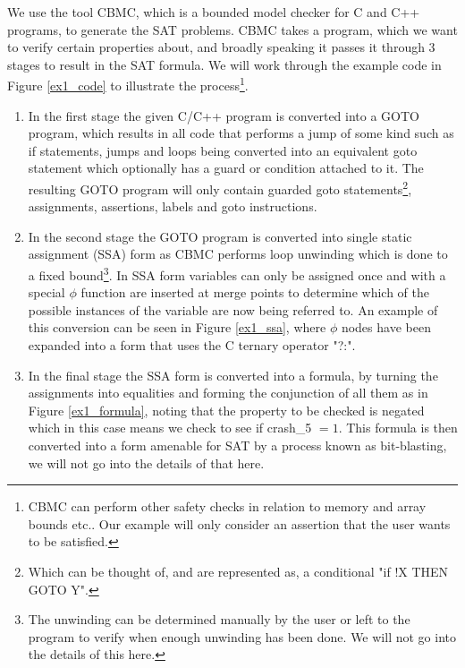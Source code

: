 \documentclass[
10pt, %
a4paper, %
oneside, %
headinclude,footinclude, %
BCOR5mm, %
]{scrartcl}
\begin{document}
We use the tool CBMC, which is a bounded model checker for C and C++ programs, to generate the SAT problems. CBMC takes a program, which we want to verify certain properties about, and broadly speaking it passes it through 3 stages to result in the SAT formula. We will work through the example code in Figure \ref{ex1_code} to illustrate the process\footnote{CBMC can perform other safety checks in relation to memory and array bounds etc.. Our example will only consider an assertion that the user wants to be satisfied.}.
\begin{enumerate}
    \item In the first stage the given C/C++ program is converted into a GOTO program, which results in all code that performs a jump of some kind such as if statements, jumps and loops being converted into an equivalent goto statement which optionally has a guard or condition attached to it. The resulting GOTO program will only contain guarded goto statements\footnote{Which can be thought of, and are represented as, a conditional "if !X THEN GOTO Y".}, assignments, assertions, labels and goto instructions.
    \item In the second stage the GOTO program is converted into single static assignment (SSA) form as CBMC performs loop unwinding which is done to a fixed bound\footnote{The unwinding can be determined manually by the user or left to the program to verify when enough unwinding has been done. We will not go into the details of this here.}. In SSA form variables can only be assigned once and with a special $\phi$ function are inserted at merge points to determine which of the possible instances of the variable are now being referred to. An example of this conversion can be seen in Figure \ref{ex1_ssa}, where $\phi$ nodes have been expanded into a form that uses the C ternary operator "?:".
    \item In the final stage the SSA form is converted into a formula, by turning the assignments into equalities and forming the conjunction of all them as in Figure \ref{ex1_formula}, noting that the property to be checked is negated which in this case means we check to see if crash\_5 $= 1$. This formula is then converted into a form amenable for SAT by a process known as bit-blasting, we will not go into the details of that here.
\end{enumerate}
\end{document}
